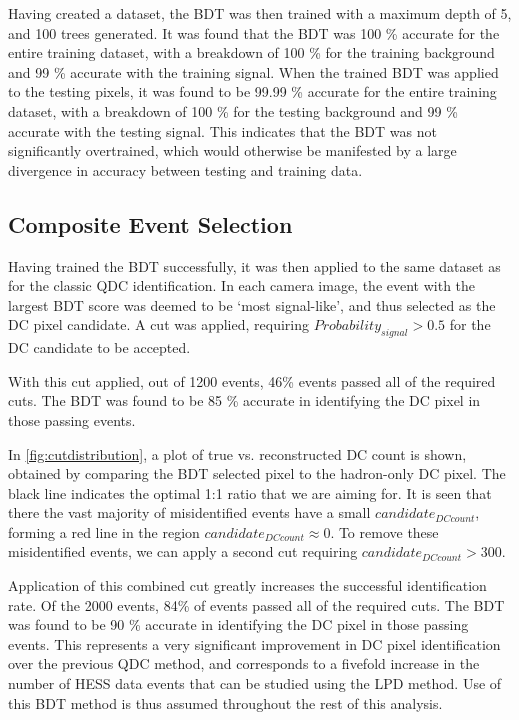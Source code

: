 \documentclass[]{article}
\begin{document}
Having created a dataset, the BDT was then trained with a maximum depth of 5, and 100 trees generated. It was found that the BDT was 100 \% accurate for the entire training dataset, with a breakdown of 100 \% for the training background and 99 \% accurate with the training signal. When the trained BDT was applied to the testing pixels, it was found to be 99.99 \%  accurate for the entire training dataset, with a breakdown of 100 \% for the testing background and 99 \% accurate with the testing signal. This indicates that the BDT was not significantly overtrained, which would otherwise be manifested by a large divergence in accuracy between testing and training data.

\subsection{Composite Event Selection}
Having trained the BDT successfully, it was then applied to the same dataset as for the classic QDC identification. In each camera image, the event with the largest BDT score was deemed to be \textquoteleft most signal-like', and thus selected as the DC pixel candidate. A cut was applied, requiring $Probability_{signal} > 0.5$ for the DC candidate to be accepted. 

With this cut applied, out of 1200 events, 46\% events passed all of the required cuts. The BDT was found to be 85 \% accurate in identifying the DC pixel in those passing events.

In \ref{fig:cutdistribution}, a plot of true vs. reconstructed DC count is shown, obtained by comparing the BDT selected pixel to the hadron-only DC pixel. The black line indicates the optimal 1:1 ratio that we are aiming for. It is seen that there the vast majority of misidentified events have a small $candidate_{DC count}$, forming a red line in the region $candidate_{DC count} \approx 0$. To remove these misidentified events, we can apply a second cut requiring $candidate_{DC count} > 300$.

Application of this combined cut greatly increases the successful identification rate. Of the 2000 events, 84\% of events passed all of the required cuts. The BDT was found to be 90 \% accurate in identifying the DC pixel in those passing events. This represents a very significant improvement in DC pixel identification over the previous QDC method, and corresponds to a fivefold increase in the number of HESS data events that can be studied using the LPD method. Use of this BDT method is thus assumed throughout the rest of this analysis.
\end{document}
